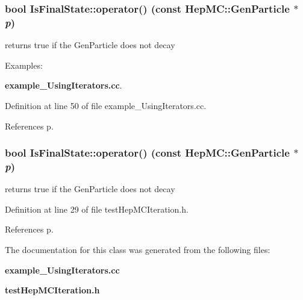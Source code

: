 \subsubsection{\setlength{\rightskip}{0pt plus 5cm}bool Is\-Final\-State::operator() (const {\bf Hep\-MC::Gen\-Particle} $\ast$ {\em p})\hspace{0.3cm}{\tt  [inline]}}\label{classIsFinalState_62aeba27a39989c7bbccef8a0fa7626a}


returns true if the Gen\-Particle does not decay 

\begin{Desc}
\item[Examples: ]\par
{\bf example\_\-Using\-Iterators.cc}.\end{Desc}


Definition at line 50 of file example\_\-Using\-Iterators.cc.

References p.
\subsubsection{\setlength{\rightskip}{0pt plus 5cm}bool Is\-Final\-State::operator() (const {\bf Hep\-MC::Gen\-Particle} $\ast$ {\em p})\hspace{0.3cm}{\tt  [inline]}}\label{classIsFinalState_62aeba27a39989c7bbccef8a0fa7626a}


returns true if the Gen\-Particle does not decay 



Definition at line 29 of file test\-Hep\-MCIteration.h.

References p.

The documentation for this class was generated from the following files:\begin{CompactItemize}
\item 
{\bf example\_\-Using\-Iterators.cc}\item 
{\bf test\-Hep\-MCIteration.h}\end{CompactItemize}
